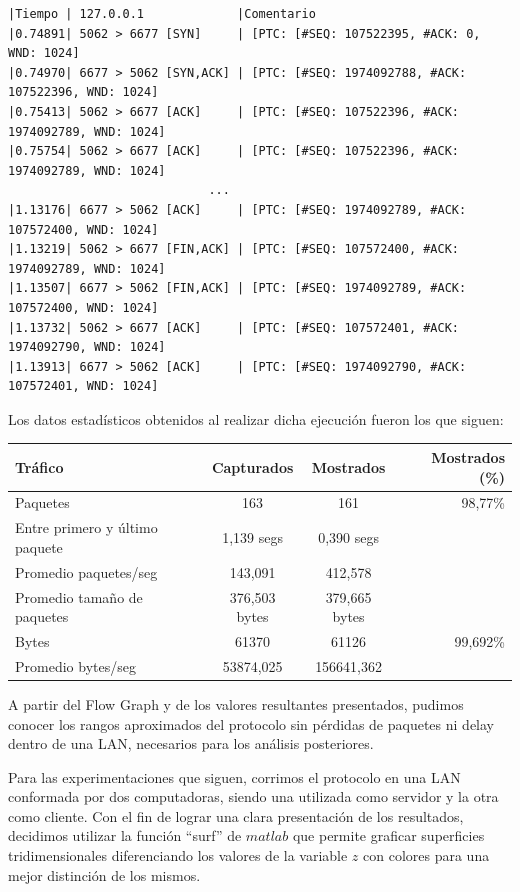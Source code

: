 \documentclass[10pt, a4paper]{article}
\begin{document}
\begin{verbatim}
|Tiempo | 127.0.0.1             |Comentario
|0.74891| 5062 > 6677 [SYN]     | [PTC: [#SEQ: 107522395, #ACK: 0, WND: 1024]
|0.74970| 6677 > 5062 [SYN,ACK] | [PTC: [#SEQ: 1974092788, #ACK: 107522396, WND: 1024]
|0.75413| 5062 > 6677 [ACK]     | [PTC: [#SEQ: 107522396, #ACK: 1974092789, WND: 1024]
|0.75754| 5062 > 6677 [ACK]     | [PTC: [#SEQ: 107522396, #ACK: 1974092789, WND: 1024]	
							...
|1.13176| 6677 > 5062 [ACK]     | [PTC: [#SEQ: 1974092789, #ACK: 107572400, WND: 1024]
|1.13219| 5062 > 6677 [FIN,ACK]	| [PTC: [#SEQ: 107572400, #ACK: 1974092789, WND: 1024]
|1.13507| 6677 > 5062 [FIN,ACK]	| [PTC: [#SEQ: 1974092789, #ACK: 107572400, WND: 1024]					
|1.13732| 5062 > 6677 [ACK]     | [PTC: [#SEQ: 107572401, #ACK: 1974092790, WND: 1024]
|1.13913| 6677 > 5062 [ACK]     | [PTC: [#SEQ: 1974092790, #ACK: 107572401, WND: 1024]
\end{verbatim}

Los datos estadísticos obtenidos al realizar dicha ejecución fueron los que siguen:\\

\begin{tabular}{l | c | c  | r}
\textbf{Tráfico} & \textbf{Capturados} & \textbf{Mostrados} & \textbf{Mostrados (\%)}\\
\hline
Paquetes & 163 & 161 & 98,77\%\\
\hline
Entre primero y último paquete & 1,139 segs & 0,390 segs & \\
\hline
Promedio paquetes/seg & 143,091 & 412,578 & \\
\hline
Promedio tamaño de paquetes & 376,503 bytes & 379,665 bytes & \\
\hline
Bytes & 61370 & 61126 & 99,692\% \\
\hline
Promedio bytes/seg & 53874,025 & 156641,362 & \\
\hline
\end{tabular}


A partir del Flow Graph y de los valores resultantes presentados, pudimos conocer los rangos aproximados del protocolo sin pérdidas de paquetes ni delay dentro de una LAN, necesarios para los análisis posteriores.

Para las experimentaciones que siguen, corrimos el protocolo en una LAN conformada por dos computadoras, siendo una utilizada como servidor y la otra como cliente. 
Con el fin de lograr una clara presentación de los resultados, decidimos utilizar la función ``surf'' de $matlab$ que permite graficar superficies tridimensionales diferenciando los valores de la variable $z$ con colores para una mejor distinción de los mismos.
\end{document}

